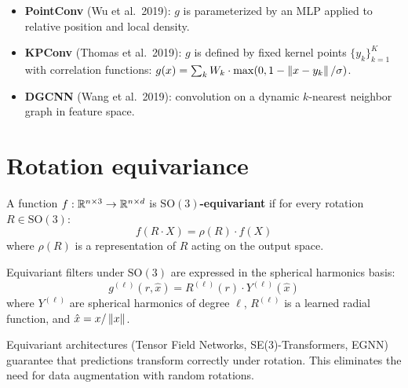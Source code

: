 \begin{example}
\begin{itemize}
  \item \textbf{PointConv} (Wu et al.\ 2019): $g$ is parameterized
        by an MLP applied to relative position and local density.
  \item \textbf{KPConv} (Thomas et al.\ 2019): $g$ is defined
        by fixed kernel points $\{y_k\}_{k=1}^K$
        with correlation functions:
        $g(x) = \sum_k W_k \cdot \max(0, 1 - \left\| x - y_k \right\|/\sigma)$.
  \item \textbf{DGCNN} (Wang et al.\ 2019): convolution on a
        dynamic $k$-nearest neighbor graph in feature space.
\end{itemize}
\end{example}

\section{Rotation equivariance}
\label{sec:rotation_equivariance}

\begin{definition}
A function $f : \mathbb{R}^{n \times 3} \to \mathbb{R}^{n \times d}$ is
\textbf{$\mathrm{SO}(3)$-equivariant} if for every rotation
$R \in \mathrm{SO}(3)$:
\[
  f(R \cdot X) = \rho(R) \cdot f(X)
\]
where $\rho(R)$ is a representation of $R$ acting on the output
space.
\end{definition}

\begin{theorem}
Equivariant filters under $\mathrm{SO}(3)$ are expressed in the
spherical harmonics basis:
\[
  g^{(\ell)}(r, \hat{x}) = R^{(\ell)}(r) \cdot Y^{(\ell)}(\hat{x})
\]
where $Y^{(\ell)}$ are spherical harmonics of degree $\ell$,
$R^{(\ell)}$ is a learned radial function, and
$\hat{x} = x / \left\| x \right\|$.
\end{theorem}

\begin{remark}
Equivariant architectures (Tensor Field Networks, SE(3)-Transformers,
EGNN) guarantee that predictions transform correctly under rotation.
This eliminates the need for data augmentation with random rotations.
\end{remark}


